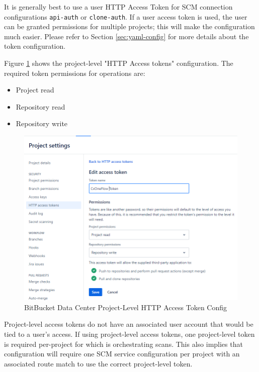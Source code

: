 It is generally best to use a user HTTP Access Token for SCM connection
configurations \texttt{api-auth} or \texttt{clone-auth}.  If a user access token is used, the user can be granted
permissions for multiple projects; this will make the \cxoneflow configuration much easier. Please refer to 
Section \ref{sec:yaml-config} for more details about the token configuration.

Figure \ref{fig:bbdc-token-config} shows the project-level "HTTP Access tokens" configuration.  The required
token permissions for \cxoneflow operations are:

\begin{itemize}
    \item Project read
    \item Repository read
    \item Repository write
\end{itemize}


\begin{figure}[ht]
    \includegraphics[width=\textwidth]{graphics/bbdc-token-config.png}
    \caption{BitBucket Data Center Project-Level HTTP Access Token Config}
    \label{fig:bbdc-token-config}
\end{figure}

Project-level access tokens do not have an associated user account that would be tied to
a user's access.  If using project-level access tokens, one project-level token is required per-project
for which \cxoneflow is orchestrating scans.  This also implies that configuration will require one SCM service 
configuration per project with an associated route match to use the correct project-level token.

